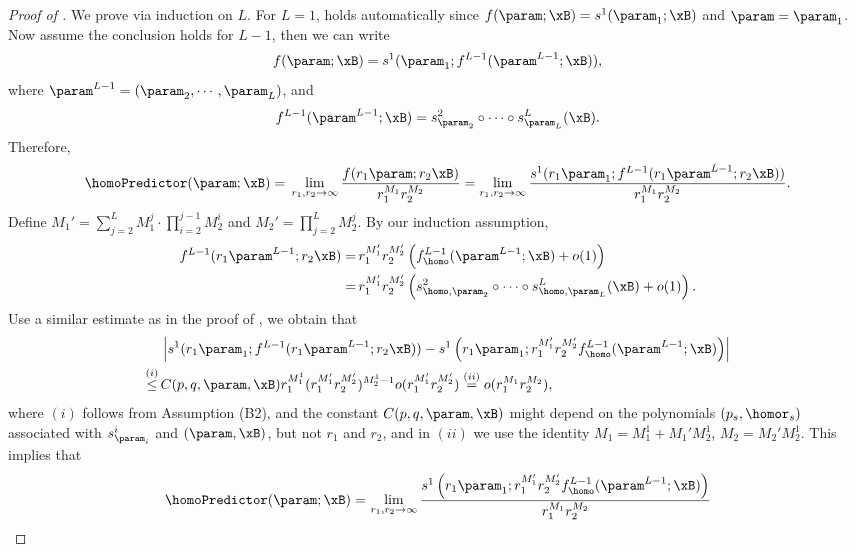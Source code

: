 \begin{proof}[Proof of ]
We prove via induction on $L$. For $L = 1$,  holds automatically since $f(\param; \xB) = s^1 (\param_1; \xB)$ and $\param = \param_1$. Now assume the conclusion holds for $L-1$, then we can write 
\begin{equation*}
f(\param; \xB) = s^1 (\param_1; f^{L-1}(\param^{L-1}; \xB)),
\end{equation*}
where $\param^{L-1} = (\param_2, \cdots, \param_L)$, and
\begin{equation*}
f^{L-1}(\param^{L-1}; \xB) = s_{\param_2}^2 \circ \cdots \circ s_{\param_L}^L (\xB).
\end{equation*}
Therefore,
\begin{equation*}
\homoPredictor (\param; \xB) = \, \lim_{r_1, r_2 \to \infty} \frac{f(r_1 \param; r_2 \xB)}{r_1^{M_1} r_2^{M_2}} = \lim_{r_1, r_2 \to \infty} \frac{s^1 (r_1 \param_1; f^{L-1}(r_1 \param^{L-1}; r_2 \xB))}{r_1^{M_1} r_2^{M_2}}.
\end{equation*}
Define $M_1' = \sum_{j=2}^{L} M_1^j \cdot \prod_{i=2}^{j-1} M_2^i$ and $M_2' = \prod_{j=2}^{L} M_2^j$. By our induction assumption,
\begin{align*}
f^{L-1}(r_1 \param^{L-1}; r_2 \xB) 
= \, & r_1^{M_1'} r_2^{M_2'} \left( f_\homo ^{L-1}(\param^{L-1}; \xB) + o(1) \right) \\
= \, & r_1^{M_1'} r_2^{M_2'} \left( s_{\homo, \param_2}^2 \circ \cdots \circ s_{\homo, \param_L}^L (\xB) + o(1) \right).
\end{align*}
Use a similar estimate as in the proof of , we obtain that
\begin{align*}
& \left\vert s^1 (r_1 \param_1; f^{L-1}(r_1 \param^{L-1}; r_2 \xB)) - s^1 \left( r_1 \param_1; r_1^{M_1'} r_2^{M_2'} f_{\homo}^{L-1}(\param^{L-1}; \xB) \right) \right\vert \\
\stackrel{(i)}{\le} \, & C (p, q, \param, \xB) r_1^{M_1^1} (r_1^{M_1'} r_2^{M_2'})^{M_2^1 - 1} o(r_1^{M_1'} r_2^{M_2'}) \stackrel{(ii)}{=} o(r_1^{M_1} r_2^{M_2}),
\end{align*}
where $(i)$ follows from Assumption (B2), and the constant $C (p, q, \param, \xB)$ might depend on the polynomials $(p_s, \homor_s)$ associated with $s_{\param_i}^i$ and $(\param, \xB)$, but not $r_1$ and $r_2$, and in $(ii)$ we use the identity $M_1 = M_1^1 + M_1' M_2^1$, $M_2 = M_2' M_2^1$. This implies that
\begin{align*}
    \homoPredictor (\param; \xB) = \, & \lim_{r_1, r_2 \to \infty} \frac{s^1 \left( r_1 \param_1; r_1^{M_1'} r_2^{M_2'} f_\homo ^{L-1}(\param^{L-1}; \xB) \right)}{r_1^{M_1} r_2^{M_2}} \\

\end{align*}
\end{proof}
